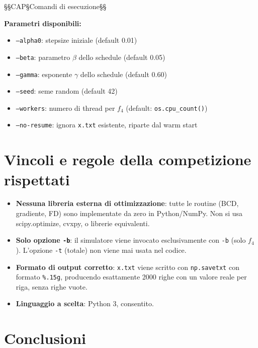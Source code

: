 \documentclass[12pt,a4paper]{article}
\theoremstyle{definition}
\begin{document}
§§CAP§Comandi di esecuzione§§



\textbf{Parametri disponibili:}
\begin{itemize}[nosep]
  \item \texttt{--alpha0}: stepsize iniziale (default 0.01)
  \item \texttt{--beta}: parametro $\beta$ dello schedule (default 0.05)
  \item \texttt{--gamma}: esponente $\gamma$ dello schedule (default 0.60)
  \item \texttt{--seed}: seme random (default 42)
  \item \texttt{--workers}: numero di thread per $f_4$ (default: \texttt{os.cpu\_count()})
  \item \texttt{--no-resume}: ignora \texttt{x.txt} esistente, riparte dal warm start
\end{itemize}

\section{Vincoli e regole della competizione rispettati}

\begin{itemize}
  \item \textbf{Nessuna libreria esterna di ottimizzazione}: tutte le routine (BCD, gradiente,
        FD) sono implementate da zero in Python/NumPy. Non si usa scipy.optimize, cvxpy, o
        librerie equivalenti.
  \item \textbf{Solo opzione \texttt{-b}}: il simulatore viene invocato esclusivamente con
        \texttt{-b} (solo $f_4$). L'opzione \texttt{-t} (totale) non viene mai usata nel codice.
  \item \textbf{Formato di output corretto}: \texttt{x.txt} viene scritto con \texttt{np.savetxt}
        con formato \texttt{\%.15g}, producendo esattamente 2000 righe con un valore reale
        per riga, senza righe vuote.
  \item \textbf{Linguaggio a scelta}: Python 3, consentito.
\end{itemize}

\section{Conclusioni}
\end{document}
